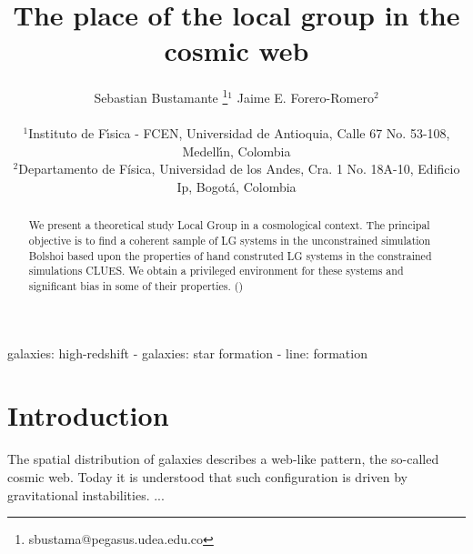 \documentclass[usenatbib]{latex/mn2e}
\begin{document}
\title[LG Environment]{The place of the local group in the cosmic web}
\author[S. Bustamante and J.E. Forero-Romero]{
\parbox[t]{\textwidth}{\raggedright 
  Sebastian Bustamante \thanks{sbustama@pegasus.udea.edu.co}$^{1}$ 
  Jaime E. Forero-Romero$^{2}$ 
}
\vspace*{6pt}\\
$^1$Instituto de F\'{\i}sica - FCEN, Universidad de Antioquia, Calle
67 No. 53-108, Medell\'{\i}n, Colombia\\ 
$^2$Departamento de F\'{i}sica, Universidad de los Andes, Cra. 1
No. 18A-10, Edificio Ip, Bogot\'a, Colombia
}

\maketitle

\begin{abstract}


We present a theoretical study Local Group in a cosmological context. 
The principal objective is to find a coherent sample of LG systems in 
the unconstrained simulation Bolshoi based upon the properties of hand 
construted LG systems in the constrained simulations CLUES. We obtain a 
privileged environment for these systems and significant bias in some of 
their properties. ()

\end{abstract}

\begin{keywords}
galaxies: high-redshift - galaxies: star formation - line: formation
\end{keywords}



\section{Introduction}
\label{sec:introduction}


The spatial distribution of galaxies describes a web-like pattern, the 
so-called cosmic web. Today it is understood that such configuration is 
driven by gravitational instabilities. ...
\end{document}
